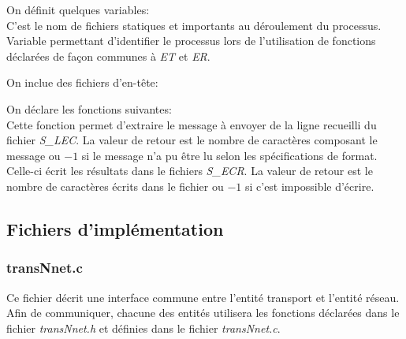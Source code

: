 \documentclass[11pt,french]{article}
\begin{document}
            \vspace{0.5cm}
            
            On définit quelques variables:\\
            
            C'est le nom de fichiers statiques et importants au déroulement du processus.\\

            
            Variable permettant d'identifier le processus lors de l'utilisation de fonctions déclarées de façon communes à \emph{ET} et \emph{ER}.
            
            \vspace{0.5cm}

            On inclue des fichiers d'en-tête:
            

            \vspace{0.5cm}

            On déclare les fonctions suivantes:\\
            
            Cette fonction permet d'extraire le message à envoyer de la ligne recueilli du fichier \emph{S\_LEC}. La valeur de retour est le
            nombre de caractères composant le message ou $-1$ si le message n'a pu être lu selon les spécifications de format.\\

            
            Celle-ci écrit les résultats dans le fichiers \emph{S\_ECR}. La valeur de retour est le nombre de caractères écrits dans le fichier
            ou $-1$ si c'est impossible d'écrire.
    \subsection{Fichiers d'implémentation} %
    \label{sub:fich-implementation-trans-entity}
        \subsubsection{transNnet.c} %
        \label{ssub:transNnet.c}
            Ce fichier décrit une interface commune entre l'entité transport et l'entité réseau. Afin de communiquer, chacune des entités utilisera les fonctions déclarées dans le fichier
            \emph{transNnet.h} et définies dans le fichier \emph{transNnet.c}.
\end{document}
